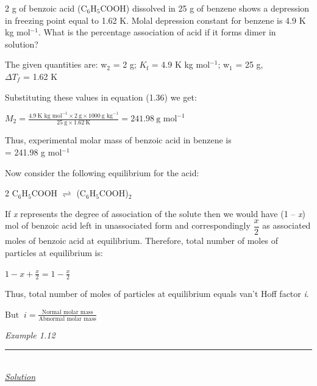 \documentclass[11pt,a4paper]{article}
\begin{document}
\vspace{8pt}
\begin{tcolorbox}[enhanced,colback=white,colframe=gray!40,boxrule=0.8pt,bottomrule=0pt,sharp corners=south,arc=2mm,left=8pt,right=24pt,top=4pt,bottom=4pt,boxsep=0pt,overlay={\fill[SkyBlue] ([xshift=-14pt]frame.south east) rectangle (frame.north east);}]
\noindent\begin{minipage}[t]{0.78\linewidth}
2 g of benzoic acid (C$_6$H$_5$COOH) dissolved in 25 g of benzene shows a depression in freezing point equal to 1.62 K. Molal depression constant for benzene is 4.9 K kg mol$^{-1}$. What is the percentage association of acid if it forms dimer in solution?

\vspace{6pt}
The given quantities are: w$_2$ = 2 g; $K_\text{f}$ = 4.9 K kg mol$^{-1}$; w$_1$ = 25 g,\\
\hspace*{3em}$\Delta T_f$ = 1.62 K

Substituting these values in equation (1.36) we get:

\hspace*{3em}$\displaystyle M_2 = \frac{4.9\ \text{K kg mol}^{-1} \times 2\ \text{g} \times 1000\ \text{g kg}^{-1}}{25\ \text{g} \times 1.62\ \text{K}} = 241.98\ \text{g mol}^{-1}$

Thus, experimental molar mass of benzoic acid in benzene is\\
\hspace*{3em}= 241.98 g mol$^{-1}$

Now consider the following equilibrium for the acid:

\hspace*{3em}2 C$_6$H$_5$COOH $\rightleftharpoons$ (C$_6$H$_5$COOH)$_2$

If \textit{x} represents the degree of association of the solute then we would have (1 -- \textit{x}) mol of benzoic acid left in unassociated form and correspondingly $\dfrac{x}{2}$ as associated moles of benzoic acid at equilibrium. Therefore, total number of moles of particles at equilibrium is:

\hspace*{3em}$\displaystyle 1 - x + \frac{x}{2} = 1 - \frac{x}{2}$

Thus, total number of moles of particles at equilibrium equals van't Hoff factor \textit{i}.

\hspace*{3em}$\displaystyle \text{But }\ i = \frac{\text{Normal molar mass}}{\text{Abnormal molar mass}}$
\end{minipage}\hfill
\begin{minipage}[t]{0.19\linewidth}
{\color{DeepSkyBlue3}\large\itshape Example 1.12}\\[-3pt]
{\color{DeepSkyBlue3}\rule{\linewidth}{0.8pt}}\\[36pt]
{\color{DeepSkyBlue3}\large\itshape\underline{Solution}}
\end{minipage}
\end{tcolorbox}
\end{document}
